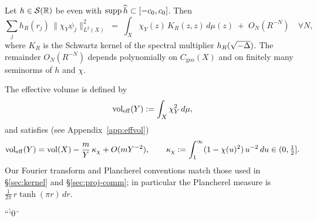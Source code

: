 \begin{lemma}\label{lem:planch}
Let $h\in\mathcal{S}(\mathbb{R})$ be even with $\operatorname{supp}\widehat{h}\subset[-c_0,c_0]$.
Then
\[
  \sum_j h_R(r_j)\,\|\chi_Y\psi_j\|_{L^2(X)}^2
  \;=\; \int_X \chi_Y(z)\,K_R(z,z)\,d\mu(z) \;+\; O_N(R^{-N})\quad\forall N,
\]
where $K_R$ is the Schwartz kernel of the spectral multiplier $h_R(\sqrt{-\Delta})$.
The remainder $O_N(R^{-N})$ depends polynomially on $C_{\mathrm{geo}}(X)$ and on finitely many seminorms of $h$ and $\chi$.
\end{lemma}

\begin{remark}
The effective volume is defined by
\[
\operatorname{vol}_{\mathrm{eff}}(Y):=\int_X \chi_Y^2\,d\mu,
\]
and satisfies (see Appendix~\ref{app:effvol})
\[
\operatorname{vol}_{\mathrm{eff}}(Y)=\operatorname{vol}(X)-\frac{m}{Y}\,\kappa_\chi+O(mY^{-2}),
\qquad
\kappa_\chi:=\int_1^\infty (1-\chi(u)^2)\,u^{-2}\,du\in(0,\tfrac12].
\]
Our Fourier transform and Plancherel conventions match those used in \S\ref{sec:kernel} and \S\ref{sec:proj-comm}; in particular the Plancherel measure is $\tfrac{1}{2\pi}\,r\tanh(\pi r)\,dr$.
\end{remark}
```0
